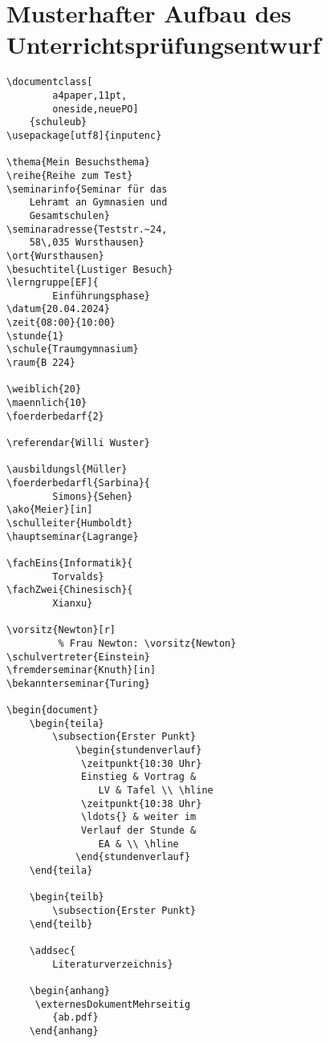 \documentclass[a4paper]{scrartcl}
\begin{document}
 \thispagestyle{empty}
 \section*{Musterhafter Aufbau des Unterrichtsprüfungsentwurf}
 \begin{lstlisting}[gobble=0,multicols=2,basicstyle=\normalsize,caption={}]
\documentclass[
		a4paper,11pt,
		oneside,neuePO]
	{schuleub}
\usepackage[utf8]{inputenc}

\thema{Mein Besuchsthema}
\reihe{Reihe zum Test}
\seminarinfo{Seminar für das 
	Lehramt an Gymnasien und 
	Gesamtschulen}
\seminaradresse{Teststr.~24, 
	58\,035 Wursthausen}
\ort{Wursthausen}
\besuchtitel{Lustiger Besuch}
\lerngruppe[EF]{
		Einführungsphase}
\datum{20.04.2024}
\zeit{08:00}{10:00}
\stunde{1}
\schule{Traumgymnasium}
\raum{B 224}

\weiblich{20}
\maennlich{10}
\foerderbedarf{2}

\referendar{Willi Wuster}

\ausbildungsl{Müller}
\foerderbedarfl{Sarbina}{
		Simons}{Sehen}
\ako{Meier}[in]
\schulleiter{Humboldt}
\hauptseminar{Lagrange}

\fachEins{Informatik}{
		Torvalds}
\fachZwei{Chinesisch}{
		Xianxu}

\vorsitz{Newton}[r]
		 % Frau Newton: \vorsitz{Newton}
\schulvertreter{Einstein}
\fremderseminar{Knuth}[in]
\bekannterseminar{Turing}

\begin{document}
	\begin{teila}
		\subsection{Erster Punkt}
			\begin{stundenverlauf}
			 \zeitpunkt{10:30 Uhr} 
			 Einstieg & Vortrag &
			 	LV & Tafel \\ \hline
			 \zeitpunkt{10:38 Uhr} 
			 \ldots{} & weiter im 
			 Verlauf der Stunde & 
			 	EA & \\ \hline
			\end{stundenverlauf}
	\end{teila}
	
	\begin{teilb}
		\subsection{Erster Punkt}
	\end{teilb}
		
	\addsec{
		Literaturverzeichnis}
		
	\begin{anhang}
	 \externesDokumentMehrseitig
		{ab.pdf}
	\end{anhang}
	 \end{lstlisting}
\clearpage

\end{document}
